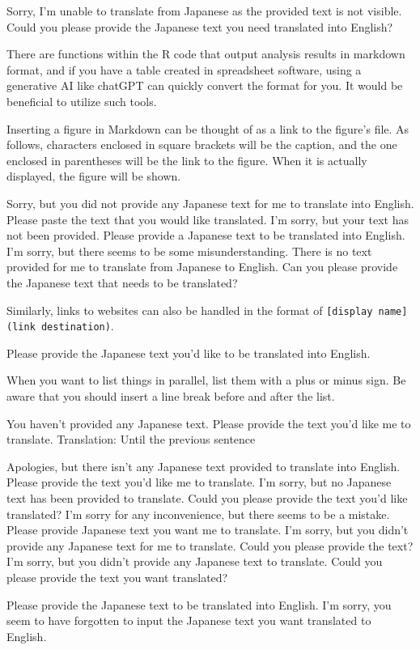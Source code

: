 \documentclass[
  a4paper,
]{book}
\begin{document}
Sorry, I'm unable to translate from Japanese as the provided text is not
visible. Could you please provide the Japanese text you need translated
into English?

There are functions within the R code that output analysis results in
markdown format, and if you have a table created in spreadsheet
software, using a generative AI like chatGPT can quickly convert the
format for you. It would be beneficial to utilize such tools.

Inserting a figure in Markdown can be thought of as a link to the
figure's file. As follows, characters enclosed in square brackets will
be the caption, and the one enclosed in parentheses will be the link to
the figure. When it is actually displayed, the figure will be shown.

Sorry, but you did not provide any Japanese text for me to translate
into English. Please paste the text that you would like translated. I'm
sorry, but your text has not been provided. Please provide a Japanese
text to be translated into English. I'm sorry, but there seems to be
some misunderstanding. There is no text provided for me to translate
from Japanese to English. Can you please provide the Japanese text that
needs to be translated?

Similarly, links to websites can also be handled in the format of
\texttt{{[}display\ name{]}(link\ destination)}.

Please provide the Japanese text you'd like to be translated into
English.

When you want to list things in parallel, list them with a plus or minus
sign. Be aware that you should insert a line break before and after the
list.

You haven't provided any Japanese text. Please provide the text you'd
like me to translate. Translation: Until the previous sentence

Apologies, but there isn't any Japanese text provided to translate into
English. Please provide the text you'd like me to translate. I'm sorry,
but no Japanese text has been provided to translate. Could you please
provide the text you'd like translated? I'm sorry for any inconvenience,
but there seems to be a mistake. Please provide Japanese text you want
me to translate. I'm sorry, but you didn't provide any Japanese text for
me to translate. Could you please provide the text? I'm sorry, but you
didn't provide any Japanese text to translate. Could you please provide
the text you want translated?

Please provide the Japanese text to be translated into English. I'm
sorry, you seem to have forgotten to input the Japanese text you want
translated to English.
\end{document}
